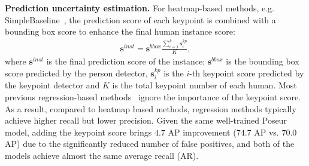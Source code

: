 \documentclass[runningheads]{llncs}
\def\handle{{Poseur}\xspace}
\begin{document}
\noindent\textbf{Prediction uncertainty estimation.} 
For heatmap-based methods,  e.g.  SimpleBaseline~\cite{xiao2018simple}, the prediction score of each keypoint is combined with a bounding box score to enhance the final human instance score:
\begin{equation}
\begin{aligned}
    \boldsymbol{s}^{inst} = \boldsymbol{s}^{bbox}\frac{\sum_{i=1}^{k}\boldsymbol{s}^{kp}_{i}}{K},
\end{aligned}
\end{equation}
where $\boldsymbol{s}^{inst}$ is the final prediction score of the instance; $\boldsymbol{s}^{bbox}$ is the bounding box score predicted by the person detector, $\boldsymbol{s}_{i}^{kp}$ is the $i$-th keypoint score predicted by the keypoint detector and $K$ is the total keypoint number of each human. 
Most previous regression-based methods~\cite{2014deeppose,sun2018integral} ignore the importance of the keypoint score.
As a result, compared to heatmap based methods, regression methods typically achieve higher recall but lower precision.
Given the same well-trained \handle model, adding the keypoint score brings $4.7$ AP improvement ($74.7$ AP vs. $70.0$ AP) due to the significantly reduced number of false positives, and both of the models achieve almost the same average recall (AR).
\end{document}
